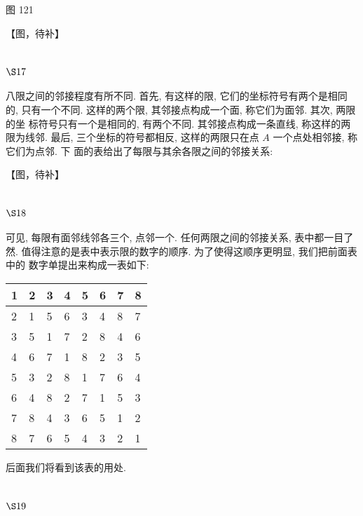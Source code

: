 图 121




【图，待补】

\section{$\S 17$}

八限之间的邻接程度有所不同. 首先, 有这样的限, 它们的坐标符号有两个是相同 的, 只有一个不同. 这样的两个限, 其邻接点构成一个面, 称它们为面邻. 其次, 两限的坐 标符号只有一个是相同的, 有两个不同. 其邻接点构成一条直线, 称这样的两限为线邻. 最后, 三个坐标的符号都相反, 这样的两限只在点 $A$ 一个点处相邻接, 称它们为点邻. 下 面的表给出了每限与其余各限之间的邻接关系:


【图，待补】

\section{$\S 18$}

可见, 每限有面邻线邻各三个, 点邻一个. 任何两限之间的邻接关系, 表中都一目了 然. 值得注意的是表中表示限的数字的顺序. 为了使得这顺序更明显, 我们把前面表中的 数字单提出来构成一表如下:

\begin{tabular}{|l|l|l|l|l|l|l|l|}
\hline 1 & 2 & 3 & 4 & 5 & 6 & 7 & 8 \\
\hline 2 & 1 & 5 & 6 & 3 & 4 & 8 & 7 \\
\hline 3 & 5 & 1 & 7 & 2 & 8 & 4 & 6 \\
\hline 4 & 6 & 7 & 1 & 8 & 2 & 3 & 5 \\
\hline 5 & 3 & 2 & 8 & 1 & 7 & 6 & 4 \\
\hline 6 & 4 & 8 & 2 & 7 & 1 & 5 & 3 \\
\hline 7 & 8 & 4 & 3 & 6 & 5 & 1 & 2 \\
\hline 8 & 7 & 6 & 5 & 4 & 3 & 2 & 1 \\
\hline
\end{tabular}

后面我们将看到该表的用处. 

\section{$\S 19$}

